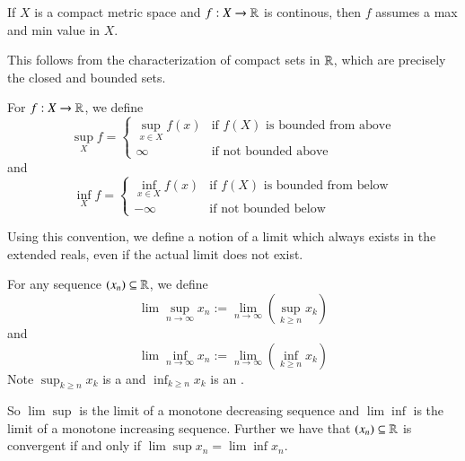 \begin{proposition}\label{prop:3.1.3}
    If $X$ is a compact metric space and $f:X\rightarrow \mathbb R$ is continous, then $f$ assumes a max and min value in $X$.
\end{proposition}
This follows from the characterization of compact sets in $\mathbb R$, which are precisely the closed and bounded sets.

\begin{definition}
    For $f:X\rightarrow \mathbb R$, we define \begin{equation*}
        \sup_{X}f = \left\{\begin{array}{cc} \sup_{x\in X}f(x) & \text{if $f(X)$ is bounded from above} \\ \infty & \text{if not bounded above} \end{array}\right.
    \end{equation*}
    and \begin{equation*}
        \inf_{X}f = \left\{\begin{array}{cc} \inf_{x\in X}f(x) & \text{if $f(X)$ is bounded from below} \\ -\infty & \text{if not bounded below} \end{array}\right.
    \end{equation*}
\end{definition}

Using this convention, we define a notion of a limit which always exists in the extended reals, even if the actual limit does not exist.

\begin{definition}
    For any sequence $(x_n) \subseteq \mathbb R$, we define \begin{equation*}
        \lim\sup\limits_{n\rightarrow \infty}x_n := \lim\limits_{n\rightarrow \infty}\left(\sup_{k\geq n}x_k\right) 
    \end{equation*}
    and \begin{equation*}
        \lim\inf\limits_{n\rightarrow \infty}x_n := \lim\limits_{n\rightarrow \infty}\left(\inf_{k\geq n}x_k\right) 
    \end{equation*}
    Note $\sup_{k\geq n}x_k$ is a  and $\inf_{k\geq n}x_k$ is an .
\end{definition}
So $\lim\sup$ is the limit of a monotone decreasing sequence and $\lim\inf$ is the limit of a monotone increasing sequence. Further we have that $(x_n) \subseteq \mathbb R$ is convergent if and only if $\lim\sup x_n = \lim\inf x_n$.

